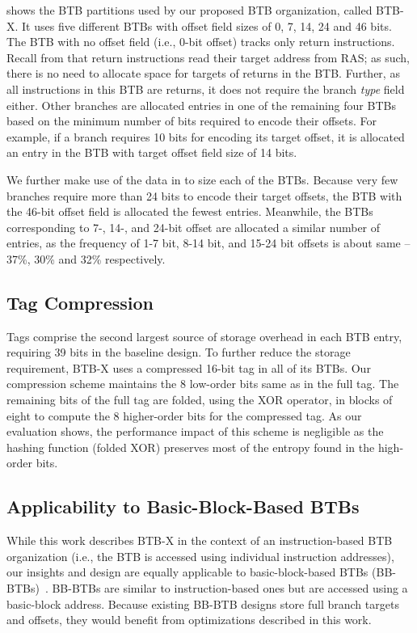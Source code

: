  shows the BTB partitions used by our proposed BTB organization, called BTB-X.
It uses five different BTBs with offset field sizes of 0, 7, 14, 24 and 46 bits. The BTB with no offset field (i.e., 0-bit offset) tracks only return instructions. Recall from  that return instructions read their target address from RAS; as such, there is no need to allocate space for targets of returns in the BTB. Further, as all instructions in this BTB are returns, it does not require the branch \textit{type} field either. Other branches are allocated entries in one of the remaining  four BTBs based on the minimum number of bits required to encode their offsets. For example, if a branch requires 10 bits for encoding its target offset, it is allocated an entry in the BTB with target offset field size of 14 bits.

We further make use of the data in  to size each of the BTBs. Because very few branches require more than 24 bits to encode their target offsets, the BTB with the 46-bit offset field is allocated the fewest entries. Meanwhile, the BTBs corresponding to 7-, 14-, and 24-bit offset are allocated a similar number of entries, as the frequency of 1-7 bit, 8-14 bit, and 15-24 bit offsets is about same -- 37\%, 30\% and 32\% respectively.

\subsection{Tag Compression}

Tags comprise the second largest source of storage overhead in each BTB entry, requiring 39 bits in the baseline design.
To further reduce the storage requirement, BTB-X uses a compressed 16-bit tag in all of its BTBs. Our compression scheme maintains the 8 low-order bits same as in the full tag. The remaining bits of the full tag are folded, using the XOR operator, in blocks of eight to compute the 8 higher-order bits for the compressed tag. As our evaluation shows, the performance impact of this scheme is negligible as the hashing function (folded XOR) preserves most of the entropy found in the high-order bits.

\subsection{Applicability to Basic-Block-Based BTBs}
While this work describes BTB-X in the context of an instruction-based BTB organization (i.e., the BTB is accessed using individual instruction addresses), our insights and design are equally applicable to basic-block-based BTBs (BB-BTBs)~\cite{fdip, boomerang, shotgun}. BB-BTBs are similar to instruction-based ones but are accessed using a basic-block address. Because existing BB-BTB designs store full branch targets and offsets, they would benefit from optimizations described in this work.
